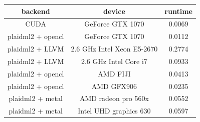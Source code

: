 \documentclass[9pt,twocolumn,twoside,notitlepage]{article}
\begin{document}
\begin{table}[htbp]
\centering
\begin{tabular}{ccc}
\hline
backend & device & runtime \\
\hline
CUDA  & GeForce GTX 1070  & 0.0069 \\
plaidml2 + opencl & GeForce GTX 1070 & 0.0112 \\
plaidml2 + LLVM  & 2.6 GHz Intel Xeon E5-2670 & 0.2774 \\
plaidml2 + LLVM  &  2.6 GHz Intel Core i7 & 0.0933\\
plaidml2 + opencl & AMD FIJI & 0.0413 \\
plaidml2 + opencl & AMD GFX906 & 0.0235\\
plaidml2 + metal & AMD radeon pro 560x & 0.0552 \\
plaidml2 + metal &  Intel UHD graphics 630 & 0.0597 \\
\hline
\end{tabular}
  \label{tab:shapefunctions}
\end{table}
\end{document}
